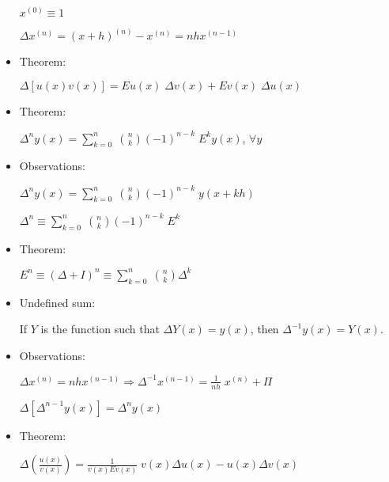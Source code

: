 \documentclass{article}
\begin{document}
\begin{itemize}
$x^{(0)} \equiv 1$

$\Delta x^{(n)} = (x + h)^{(n)} - x^{(n)} = nhx^{(n-1)}$

\item Theorem:

$\Delta [u(x)v(x)] = Eu(x) \; \Delta v(x) + Ev(x) \; \Delta u(x)$

\item Theorem:

$\Delta^{n} y(x) = \sum\limits_{k = 0}^{n} \; \binom{n}{k} (-1)^{n - k} \; E^{k} y(x)$, $\forall y$

\item Observations:

$\Delta^{n} y(x) = \sum\limits_{k = 0}^{n} \; \binom{n}{k} (-1)^{n - k} \; y(x + kh)$

$\Delta^{n} \equiv \sum\limits_{k = 0}^{n} \; \binom{n}{k} (-1)^{n - k} \; E^{k}$

\item Theorem:

$E^{n} \equiv (\Delta + I)^{n} \equiv \sum\limits_{k = 0}^{n} \; \binom{n}{k} \Delta^{k}$

\item Undefined sum:

If $Y$ is the function such that $\Delta Y(x) = y(x)$, then $\Delta^{-1} y(x) = Y(x)$.

\item Observations:

$\Delta x^{(n)} = nhx^{(n - 1)} \Rightarrow \Delta^{-1} x^{(n - 1)} = \frac{1}{nh} \; x^{(n)} + \Pi$

$\Delta [\Delta^{n - 1} y(x)] = \Delta^{n} y(x)$

\item Theorem:

$\Delta (\frac{u(x)}{v(x)}) = \frac{1}{v(x) Ev(x)} \; v(x) \Delta u(x) - u(x) \Delta v(x)$
    
\end{itemize}
\end{document}
